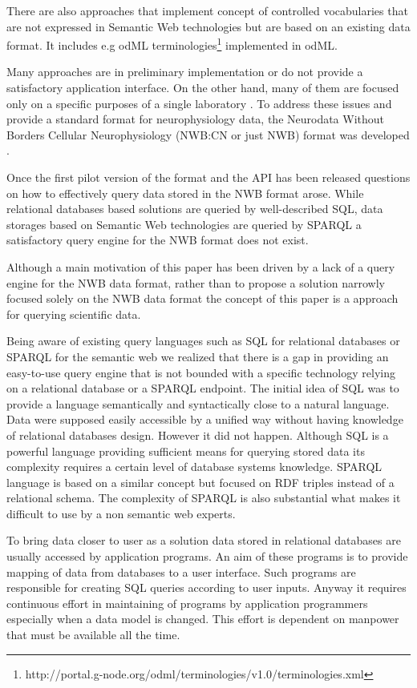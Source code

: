 \documentclass[utf8]{frontiersSCNS} %
\begin{document}
There are also approaches that implement concept of controlled vocabularies that are not expressed in Semantic Web technologies but are based on an existing data format. It includes e.g odML terminologies\footnote{http://portal.g-node.org/odml/terminologies/v1.0/terminologies.xml} implemented in odML.

Many approaches are in preliminary implementation or do not provide a satisfactory application interface. On the other hand, many of them are focused only on a specific purposes of a single laboratory \citep{doi:10.1142/S0219635202000128}. To address these issues and provide a standard format for neurophysiology data, the Neurodata Without Borders Cellular Neurophysiology (NWB:CN or just NWB) format was developed \citep{teeters-neuron}. 

Once the first pilot version of the format and the API has been released questions on how to effectively query data stored in the NWB format arose. While relational databases based solutions are queried by well-described SQL, data storages based on Semantic Web technologies are queried by SPARQL \citep{prudhommeaux2008sparql} a satisfactory query engine for the NWB format does not exist. 

Although a main motivation of this paper has been driven by a lack of a query engine for the NWB data format, rather than to propose a solution narrowly focused solely on the NWB data format the concept of this paper is a approach for querying scientific data.

Being aware of existing query languages such as SQL for relational databases or SPARQL for the semantic web we realized that there is a gap in providing an easy-to-use query engine that is not bounded with a specific technology relying on a relational database or a SPARQL endpoint. The initial idea of SQL was to provide a language semantically and syntactically close to a natural language. Data were supposed easily accessible by a unified way without having knowledge of relational databases design. However it did not happen. Although SQL is a powerful language providing sufficient means for querying stored data its complexity requires a certain level of database systems knowledge. SPARQL language is based on a similar concept but focused on RDF triples instead of a relational schema. The complexity of SPARQL is also substantial what makes it difficult to use by a non semantic web experts.

To bring data closer to user as a solution data stored in relational databases are usually accessed by application programs. An aim of these programs is to provide mapping of data from databases to a user interface. Such programs are responsible for creating SQL queries according to user inputs. Anyway it requires continuous effort in maintaining of programs by application programmers especially when a data model is changed. This effort is dependent on manpower that must be available all the time.
\end{document}
